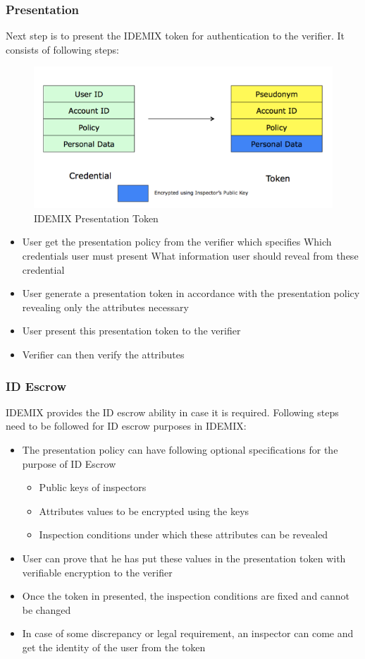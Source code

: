 \subsubsection{Presentation}
Next step is to present the IDEMIX token for authentication to the verifier. It consists of following steps:
\begin{figure}[h]
	\centering
	\includegraphics[width=\textwidth]{figures/Token}
	\caption{IDEMIX Presentation Token}
	\label{fig:Token}
\end{figure}
\begin{itemize}
	\item User get the presentation policy from the verifier which specifies
		\subitem Which credentials user must present
		\subitem What information user should reveal from these credential
	\item User generate a presentation token in accordance with the presentation policy revealing only the attributes necessary
	\item User present this presentation token to the verifier
	\item Verifier can then verify the attributes
\end{itemize}
\subsubsection{ID Escrow}
IDEMIX provides the ID escrow ability in case it is required. Following steps need to be followed for ID escrow purposes in IDEMIX:
\begin{itemize}
	\item The presentation policy can have following optional specifications for the purpose of ID Escrow
	\begin{itemize}
		\item Public keys of inspectors
		\item Attributes values to be encrypted using the keys	
		\item Inspection conditions under which these attributes can be revealed
	\end{itemize}
	\item User can prove that he has put these values in the presentation token with verifiable encryption to the verifier
	\item Once the token in presented, the inspection conditions are fixed and cannot be changed 
	\item In case of some discrepancy or legal requirement, an inspector can come and get the identity of the user from the token
\end{itemize}


